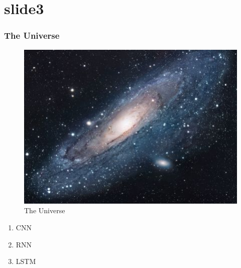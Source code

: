 \documentclass[xcolor=dvipsnames]{beamer}
\begin{document}
        \section{slide3}
        \begin{frame}[t]

            \frametitle{The Universe}

            \begin{figure}[h!]
                \centering
                \includegraphics[scale=1.7]{universe.jpg}
                \caption{The Universe}
                \label{universe}
                \pause
            \end{figure}

            \begin{enumerate}
                \item CNN
                \item RNN
                \item LSTM
            \end{enumerate}

        \end{frame}
\end{document}
